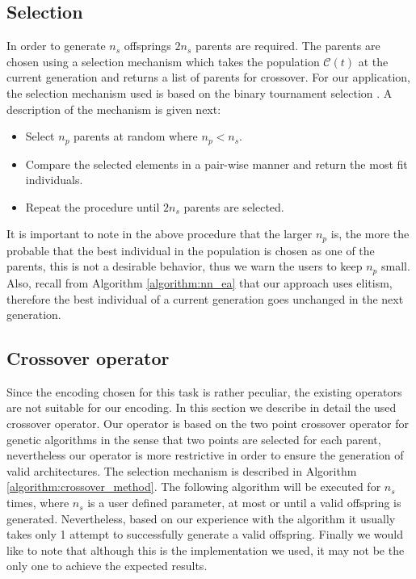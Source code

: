 \documentclass[journal]{IEEEtran}
\begin{document}
\subsection{Selection}
\label{sec:selection}

In order to generate $n_s$ offsprings $2n_s$ parents are required. The parents are chosen using a selection mechanism which takes the population $\mathcal{C}(t)$ at the current generation and returns a list of parents for crossover. For our application, the selection mechanism used is based on the binary tournament selection \cite{Engelbrecht2007, Krishnakumar1989}. A description of the mechanism is given next: 

\begin{itemize}
\item Select $n_p$ parents at random where $n_p < n_s$.
\item Compare the selected elements in a pair-wise manner and return the most fit individuals.
\item Repeat the procedure until $2n_s$ parents are selected.
\end{itemize}

It is important to note in the above procedure that the larger $n_p$ is, the more the probable that the best individual in the population is chosen as one of the parents, this is not a desirable behavior, thus we warn the users to keep $n_p$ small. Also, recall from Algorithm \ref{algorithm:nn_ea} that our approach uses elitism, therefore the best individual of a current generation goes unchanged in the next generation.

\subsection{Crossover operator}
\label{sec:crossover}

Since the encoding chosen for this task is rather peculiar, the existing operators are not suitable for our encoding. In this section we describe in detail the used crossover operator. Our operator is based on the two point crossover operator for genetic algorithms \cite{holland1992} in the sense that two points are selected for each parent, nevertheless our operator is more restrictive in order to ensure the generation of valid architectures. The selection mechanism is described in Algorithm \ref{algorithm:crossover_method}. The following algorithm will be executed for $n_s$ times, where $n_s$ is a user defined parameter, at most or until a valid offspring is generated. Nevertheless, based on our experience with the algorithm it usually takes only 1 attempt to successfully generate a valid offspring. Finally we would like to note that although this is the implementation we used, it may not be the only one to achieve the expected results.
\end{document}
